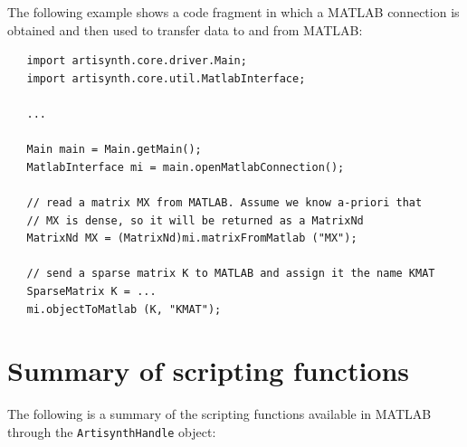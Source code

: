 \documentclass{article}
\begin{document}
The following example shows a code fragment in which a MATLAB
connection is obtained and then used to transfer data to and from
MATLAB:

\begin{lstlisting}
   import artisynth.core.driver.Main;
   import artisynth.core.util.MatlabInterface;

   ...

   Main main = Main.getMain();
   MatlabInterface mi = main.openMatlabConnection();

   // read a matrix MX from MATLAB. Assume we know a-priori that
   // MX is dense, so it will be returned as a MatrixNd
   MatrixNd MX = (MatrixNd)mi.matrixFromMatlab ("MX");

   // send a sparse matrix K to MATLAB and assign it the name KMAT
   SparseMatrix K = ...
   mi.objectToMatlab (K, "KMAT");
\end{lstlisting}

\section{Summary of scripting functions}
\label{ScriptingMethods:sec}

The following is a summary of the scripting functions available
in MATLAB through the {\tt ArtisynthHandle} object:
\end{document}

